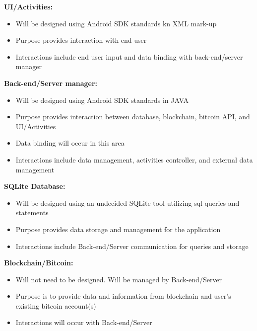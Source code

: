 \textbf{UI/Activities:}\\
\begin{itemize}
\item Will be designed using Android SDK standards kn XML mark-up 
\item Purpose provides interaction with end user
\item Interactions include end user input and data binding with back-end/server manager\\
\end{itemize}

\textbf{Back-end/Server manager:}\\
\begin{itemize}
\item Will be designed using Android SDK standards in JAVA
\item Purpose provides interaction between database, blockchain, bitcoin API, and UI/Activities
\item Data binding will occur in this area
\item Interactions include data management, activities controller, and external data management\\
\end{itemize}

\textbf{SQLite Database:}\\
\begin{itemize}
\item Will be designed using an undecided SQLite tool utilizing sql queries and statements 
\item Purpose provides data storage and management for the application
\item Interactions include Back-end/Server communication for queries and storage\\
\end{itemize}

\textbf{Blockchain/Bitcoin:}\\
\begin{itemize}
\item Will not need to be designed. Will be managed by Back-end/Server
\item Purpose is to provide data and information from blockchain and user's existing bitcoin account(s)
\item Interactions will occur with Back-end/Server\\
\end{itemize}
